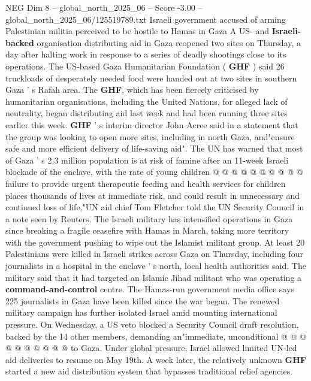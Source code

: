 \begin{textsample}{NEG Dim 8 – global\_north\_2025\_06 – Score -3.00 – global\_north\_2025\_06/125519789.txt}  \label{ex:f8_neg_025}
Israeli government accused of arming Palestinian militia perceived to be hostile to Hamas in Gaza A US- and \textbf{Israeli-backed} organisation distributing aid in Gaza reopened two sites on Thursday, a day after halting work in response to a series of deadly shootings close to its operations.
The US-based Gaza Humanitarian Foundation ( \textbf{GHF} ) said 26 truckloads of desperately needed food were handed out at two sites in southern Gaza ' s Rafah area.
The \textbf{GHF}, which has been fiercely criticised by humanitarian organisations, including the United Nations, for alleged lack of neutrality, began distributing aid last week and had been running three sites earlier this week. \textbf{GHF} ' s interim director John Acree said in a statement that the group was looking to open more sites, including in north Gaza, and"ensure safe and more efficient delivery of life-saving aid".
The UN has warned that most of Gaza ' s 2.3 million population is at risk of famine after an 11-week Israeli blockade of the enclave, with the rate of young children @ @ @ @ @ @ @ @ @ @ failure to provide urgent therapeutic feeding and health services for children places thousands of lives at immediate risk, and could result in unnecessary and continued loss of life,"UN aid chief Tom Fletcher told the UN Security Council in a note seen by Reuters.
The Israeli military has intensified operations in Gaza since breaking a fragile ceasefire with Hamas in March, taking more territory with the government pushing to wipe out the Islamist militant group.
At least 20 Palestinians were killed in Israeli strikes across Gaza on Thursday, including four journalists in a hospital in the enclave ' s north, local health authorities said.
The military said that it had targeted an Islamic Jihad militant who was operating a \textbf{command-and-control} centre.
The Hamas-run government media office says 225 journalists in Gaza have been killed since the war began.
The renewed military campaign has further isolated Israel amid mounting international pressure.
On Wednesday, a US veto blocked a Security Council draft resolution, backed by the 14 other members, demanding an"immediate, unconditional @ @ @ @ @ @ @ @ @ @ to Gaza.
Under global pressure, Israel allowed limited UN-led aid deliveries to resume on May 19th.
A week later, the relatively unknown \textbf{GHF} started a new aid distribution system that bypasses traditional relief agencies.

\end{textsample}
